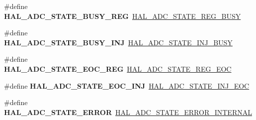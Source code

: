 \begin{DoxyCompactItemize}
\item 
\mbox{\label{group___h_a_l___a_d_c___aliased___defines_ga3bfd5015d60e3116e55ff81e6627f041}} 
\#define {\bfseries H\+A\+L\+\_\+\+A\+D\+C\+\_\+\+S\+T\+A\+T\+E\+\_\+\+B\+U\+S\+Y\+\_\+\+R\+EG}~\mbox{\hyperlink{group___a_d_c___exported___types_ga516d4b4ebc261c241c69d96aae19acc3}{H\+A\+L\+\_\+\+A\+D\+C\+\_\+\+S\+T\+A\+T\+E\+\_\+\+R\+E\+G\+\_\+\+B\+U\+SY}}
\item 
\mbox{\label{group___h_a_l___a_d_c___aliased___defines_ga9dc7360fd46380f3149e09780cd8f4b4}} 
\#define {\bfseries H\+A\+L\+\_\+\+A\+D\+C\+\_\+\+S\+T\+A\+T\+E\+\_\+\+B\+U\+S\+Y\+\_\+\+I\+NJ}~\mbox{\hyperlink{group___a_d_c___exported___types_ga0044d240de80a70923b5c970d19ba24b}{H\+A\+L\+\_\+\+A\+D\+C\+\_\+\+S\+T\+A\+T\+E\+\_\+\+I\+N\+J\+\_\+\+B\+U\+SY}}
\item 
\mbox{\label{group___h_a_l___a_d_c___aliased___defines_ga12555d013385a39ef776f1177420033c}} 
\#define {\bfseries H\+A\+L\+\_\+\+A\+D\+C\+\_\+\+S\+T\+A\+T\+E\+\_\+\+E\+O\+C\+\_\+\+R\+EG}~\mbox{\hyperlink{group___a_d_c___exported___types_gae2da191bffb720a553a1e39c10929711}{H\+A\+L\+\_\+\+A\+D\+C\+\_\+\+S\+T\+A\+T\+E\+\_\+\+R\+E\+G\+\_\+\+E\+OC}}
\item 
\mbox{\label{group___h_a_l___a_d_c___aliased___defines_ga2d1ddc7f0311b8faf6266a3e3c005c28}} 
\#define {\bfseries H\+A\+L\+\_\+\+A\+D\+C\+\_\+\+S\+T\+A\+T\+E\+\_\+\+E\+O\+C\+\_\+\+I\+NJ}~\mbox{\hyperlink{group___a_d_c___exported___types_gafcfffd11ab8b84d3b0a1ce50ccf821d5}{H\+A\+L\+\_\+\+A\+D\+C\+\_\+\+S\+T\+A\+T\+E\+\_\+\+I\+N\+J\+\_\+\+E\+OC}}
\item 
\mbox{\label{group___h_a_l___a_d_c___aliased___defines_ga83e3447e639d1a9019732255700ac23a}} 
\#define {\bfseries H\+A\+L\+\_\+\+A\+D\+C\+\_\+\+S\+T\+A\+T\+E\+\_\+\+E\+R\+R\+OR}~\mbox{\hyperlink{group___a_d_c___exported___types_ga65b592627f1f9277f4b89bfc33a9e641}{H\+A\+L\+\_\+\+A\+D\+C\+\_\+\+S\+T\+A\+T\+E\+\_\+\+E\+R\+R\+O\+R\+\_\+\+I\+N\+T\+E\+R\+N\+AL}}
\item 
\mbox{\label{group___h_a_l___a_d_c___aliased___defines_ga063cc0bfc15747a4c96d2868273a4516}} 

\end{DoxyCompactItemize}

